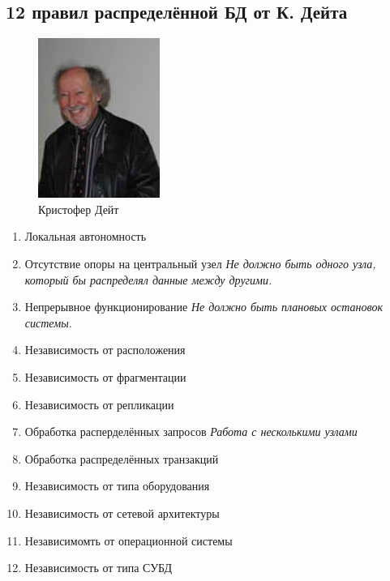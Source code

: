 \documentclass{article}
\begin{document}
\subsection{12 правил распределённой БД от К. Дейта}
\begin{figure}[H]
    \centering
    \includegraphics[width = .5\linewidth]{img0}
    \caption{Кристофер Дейт}
  \end{figure}
\begin{enumerate}
    \item Локальная автономность
    \item Отсутствие опоры на центральный узел
    \newline \textit{Не должно быть одного узла, который бы распределял данные между другими.}
    \item Непрерывное функционирование
    \newline \textit{Не должно быть плановых остановок системы.}
    \item Независимость от расположения
    \item Независимость от фрагментации
    \item Независимость от репликации
    \item Обработка расперделённых запросов
    \newline \textit{Работа с несколькими узлами}
    \item Обработка распределённых транзакций
    \item Независимость от типа оборудования
    \item Независимость от сетевой архитектуры
    \item Независимомть от операционной системы
    \item Независимость от типа СУБД
\end{enumerate}
\end{document}
